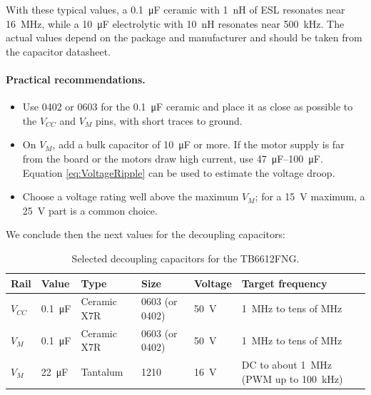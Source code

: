 \documentclass[pdflatex,sn-mathphys-num]{sn-jnl}%
\begin{document}
With these typical values, a \SI{0.1}{\micro\farad} ceramic with \SI{1}{\nano\henry}
of ESL resonates near \SI{16}{\mega\hertz}, while a \SI{10}{\micro\farad}
electrolytic with \SI{10}{\nano\henry} resonates near \SI{500}{\kilo\hertz}.
The actual values depend on the package and manufacturer and should be taken
from the capacitor datasheet.

 
\paragraph{Practical recommendations.}
\begin{itemize}
  \item Use 0402 or 0603 for the \SI{0.1}{\micro\farad} ceramic and place it
        as close as possible to the
        $V_{CC}$ and $V_M$ pins, with short traces to ground.
  \item On $V_M$, add a bulk capacitor of \SI{10}{\micro\farad} or more. If the
        motor supply is far from the board or the motors draw high current,
        use \SIrange{47}{100}{\micro\farad}. Equation \ref{eq:VoltageRipple} can be used to estimate the voltage droop.
  \item Choose a voltage rating well above the maximum $V_M$; for a
        \SI{15}{\volt} maximum, a \SI{25}{\volt} part is a common choice.
\end{itemize}
 
We conclude then the next values for the decoupling capacitors:

\begin{table}[h]
  \centering
  \caption{Selected decoupling capacitors for the TB6612FNG.}
  \begin{tabular}{llllll}
    \toprule
    Rail & Value & Type & Size & Voltage & Target frequency \\
    \midrule
    $V_{CC}$ & \SI{0.1}{\micro\farad} & Ceramic X7R & 0603 (or 0402) & \SI{50}{\volt} & \SI{1}{\mega\hertz} to tens of \si{\mega\hertz} \\
    $V_M$ & \SI{0.1}{\micro\farad} & Ceramic X7R & 0603 (or 0402) & \SI{50}{\volt} & \SI{1}{\mega\hertz} to tens of \si{\mega\hertz} \\
    $V_M$ & \SI{22}{\micro\farad} & Tantalum & 1210 & \SI{16}{\volt} & DC to about \SI{1}{\mega\hertz} (PWM up to \SI{100}{\kilo\hertz}) \\    \bottomrule
  \end{tabular}
\end{table}

\end{document}
